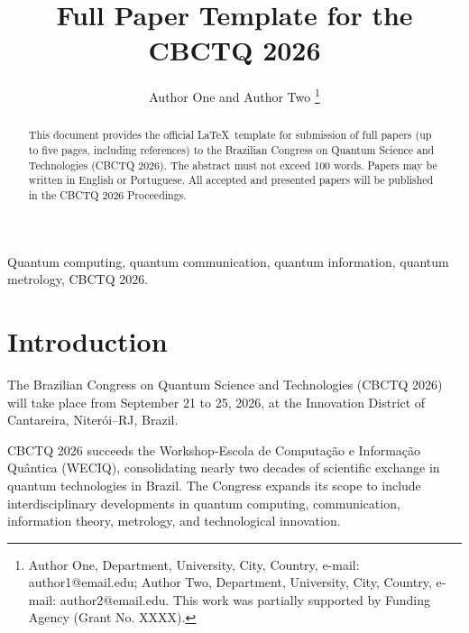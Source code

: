 \documentclass{cbctq}
\begin{document}
\title{Full Paper Template for the CBCTQ 2026}

\author{
Author One and Author Two%
\thanks{
Author One, Department, University, City, Country, e-mail: author1@email.edu;
Author Two, Department, University, City, Country, e-mail: author2@email.edu.
This work was partially supported by Funding Agency (Grant No. XXXX).
}
}

\maketitle




\begin{abstract}
This document provides the official \LaTeX\ template for submission of full papers (up to five pages, including references) to the Brazilian Congress on Quantum Science and Technologies (CBCTQ 2026). The abstract must not exceed 100 words. Papers may be written in English or Portuguese. All accepted and presented papers will be published in the CBCTQ 2026 Proceedings.
\end{abstract}

\begin{keywords}
Quantum computing, quantum communication, quantum information, quantum metrology, CBCTQ 2026.
\end{keywords}

\section{Introduction}

The Brazilian Congress on Quantum Science and Technologies (CBCTQ 2026) will take place from September 21 to 25, 2026, at the Innovation District of Cantareira, Niterói--RJ, Brazil.

CBCTQ 2026 succeeds the Workshop-Escola de Computação e Informação Quântica (WECIQ), consolidating nearly two decades of scientific exchange in quantum technologies in Brazil. The Congress expands its scope to include interdisciplinary developments in quantum computing, communication, information theory, metrology, and technological innovation.
\end{document}
